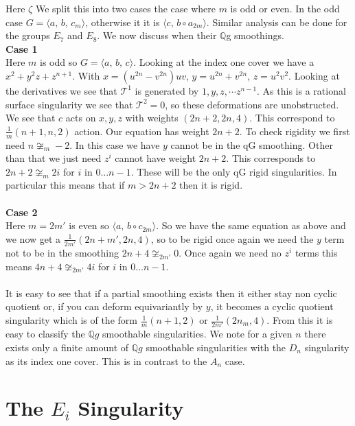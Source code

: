 \documentclass[11pt]{report}
\theoremstyle{definition}
\theoremstyle{definition}
\theoremstyle{definition}
\theoremstyle{definition}
\theoremstyle{definition}
\theoremstyle{definition}
\theoremstyle{definition}
\theoremstyle{definition}
\begin{document}
Here $\zeta$ We split this into two cases the case where $m$ is odd or even. In the odd case $G = \langle a, \, b, \, c_m \rangle$, otherwise it it is $\langle c, \, b \circ a_{2m} \rangle$.
Similar analysis can be done for the groups $E_7$ and $E_8$. We now discuss when their $\mathbb{Q}$g smoothings.
\\
\textbf{Case 1}
\\
Here $m$ is odd so  $G = \langle a, \, b , \, c \rangle$.  Looking at the index one cover we have a $x^2 + y^2z + z^{n+1}$. With $x = (u^{2n} - v^{2n})uv$, $y = u^{2n} + v^{2n}$, $z = u^2v^2$. Looking at the derivatives we see that $\mathcal{T}^1$ is generated by $1,y, z, \cdots z^{n-1}$. As this is a rational surface singularity we see that $\mathcal{T}^2 = 0$, so these deformations are unobstructed. We see that $c$ acts on $x,y,z$ with weights $(2n+2, 2n, 4)$. This correspond to $\frac{1}{m}(n+1, n, 2)$ action. Our equation has weight $2n+2$. To check rigidity we first need $n \not\cong_m -2$. In this case we have $y$ cannot be in the qG smoothing. Other than that we just need $z^i$ cannot have weight $2n+2$. This corresponds to $2n+2 \not\cong_m 2i$ for $i$ in $0 \dots n-1$. These will be the only qG rigid singularities. In particular this means that if $m > 2n+2$ then it is rigid.
\\
\\
\textbf{Case 2}
\\
Here $m = 2m'$ is even so $\langle a, \, b \circ c_{2m} \rangle$. So we have the same equation as above and we now get a 
$\frac{1}{2m'}(2n+m', 2n, 4)$, so to be rigid once again we need the $y$ term not to be in the smoothing $2n+4
 \not\cong_{2m'} 0$. Once again we need no $z^i$ terms this means  $4n+4 \not\cong_{2m'} 4i$  for $i$ in $0 \dots n-1$. 
 \\
 \\
 It is easy to see that if a partial smoothing exists then it either stay non cyclic quotient or, if you can deform equivariantly by $y$, it becomes a cyclic quotient singularity which is of the form $\frac{1}{m}(n+1, 2)$ or $\frac{1}{2m'}(2n_m, 4)$. From this it is easy to classify the $\mathbb{Q}g$ smoothable singularities. We note for a given $n$ there exists only a finite amount of $\mathbb{Q}g$ smoothable singularities with the $D_n$ singularity as its index one cover. This is in contrast to the $A_n$ case.
 
 \section{The $E_i$ Singularity}
 
\end{document}
